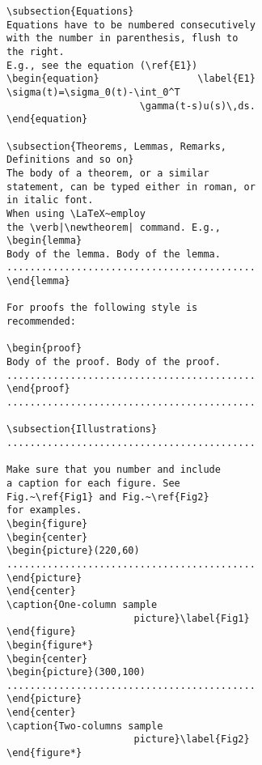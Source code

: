 \begin{verbatim}
\subsection{Equations}
Equations have to be numbered consecutively
with the number in parenthesis, flush to
the right.
E.g., see the equation (\ref{E1})
\begin{equation}                 \label{E1}
\sigma(t)=\sigma_0(t)-\int_0^T
                       \gamma(t-s)u(s)\,ds.
\end{equation}

\subsection{Theorems, Lemmas, Remarks,
Definitions and so on}
The body of a theorem, or a similar
statement, can be typed either in roman, or
in italic font.
When using \LaTeX~employ
the \verb|\newtheorem| command. E.g.,
\begin{lemma}
Body of the lemma. Body of the lemma.
...........................................
\end{lemma}

For proofs the following style is
recommended:

\begin{proof}
Body of the proof. Body of the proof.
...........................................
\end{proof}
...........................................

\subsection{Illustrations}
...........................................

Make sure that you number and include
a caption for each figure. See
Fig.~\ref{Fig1} and Fig.~\ref{Fig2}
for examples.
\begin{figure}
\begin{center}
\begin{picture}(220,60)
...........................................
\end{picture}
\end{center}
\caption{One-column sample
                      picture}\label{Fig1}
\end{figure}
\begin{figure*}
\begin{center}
\begin{picture}(300,100)
...........................................
\end{picture}
\end{center}
\caption{Two-columns sample
                      picture}\label{Fig2}
\end{figure*}


\end{verbatim}
